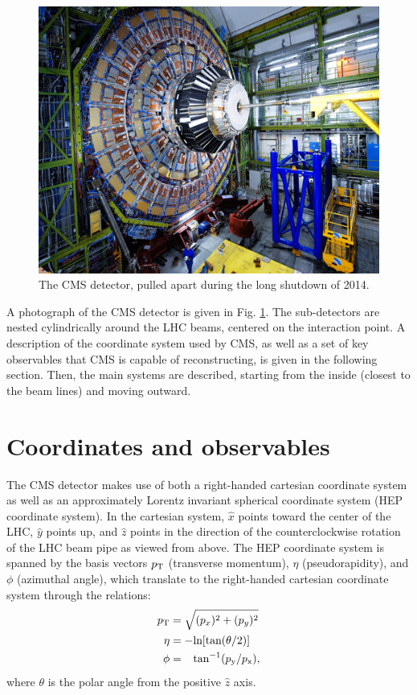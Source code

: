 \begin{figure}[h]
\centering
\includegraphics[width=0.6\linewidth]{figures/CMS/CMSBetter.jpg}
\caption{The CMS detector, pulled apart during the long shutdown of 2014. } 
\label{fig:CmsPulledApart}
\end{figure}
A photograph of the CMS detector is given in Fig. \ref{fig:CmsPulledApart}. The sub-detectors are nested cylindrically around the LHC beams, centered on the interaction point. A description of the coordinate system used by CMS, as well as a set of key observables that CMS is capable of reconstructing, is given in the following section. Then, the main systems are described, starting from the inside (closest to the beam lines) and moving outward.

\section{Coordinates and observables}
The CMS detector makes use of both a right-handed cartesian coordinate system as well as an approximately Lorentz invariant spherical coordinate system (HEP coordinate system). In the cartesian system, $\hat{x}$ points toward the center of the LHC, $\hat{y}$ points up, and $\hat{z}$ points in the direction of the counterclockwise rotation of the LHC beam pipe as viewed from above. The HEP coordinate system is spanned by the basis vectors $p_{\text{T}}$ (transverse momentum), $\eta$ (pseudorapidity), and $\phi$ (azimuthal angle), which translate to the right-handed cartesian coordinate system through the relations:
\begin{align}
p_{\text{T}} &= \sqrt{(p_{x})^2+(p_{y})^2}\\
\eta &= -\text{ln}[\text{tan}(\theta/2)]\\
\phi &= \hphantom{-}\text{tan}^{-1}(p_{\text{y}}/p_{\text{x}}),
\end{align}
where $\theta$ is the polar angle from the positive $\hat{z}$ axis.

